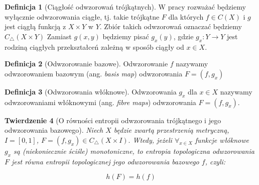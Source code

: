 \documentclass[licencjacka]{pwr_wmat_praca_dyplomowa}
\theoremstyle{plain}
\newtheorem{theorem}{Twierdzenie}
\numberwithin{theorem}{chapter}
\theoremstyle{definition}
\numberwithin{theorem}{chapter}
\newtheorem{definition}[theorem]{Definicja}
\begin{document}
\begin{definition}[Ciągłość odwzorowań trójkątnych]
W pracy rozważać będziemy wyłącznie odwzorowania ciągłe, tj. takie trójkątne $F$ dla których $f \in C(X)$ i $g$ jest ciągłą funkcją z $X \times Y$ w $Y$. 
Zbiór takich odwzorowań oznaczać będziemy $C_\triangle(X \times Y)$
Zamiast $g(x, y)$ będziemy pisać $g_x(y)$, gdzie $g_x: Y \rightarrow Y$ jest rodziną ciągłych przekształceń zależną w sposób ciągły od $x \in X$.
\end{definition}


\begin{definition}[Odwzorowanie bazowe]
Odwzorowanie $f$ nazywamy odwzorowaniem bazowym (ang. \textit{basis map}) odwzorowania $F = (f, g_x)$
\end{definition}

\begin{definition}[Odwzorowania włóknowe]
Odwzorowania $g_x$ dla $x \in X$ nazywamy odwzorowaniami włóknowymi (ang. \textit{fibre maps}) odwzorowania $F = (f, g_x)$.
\end{definition}


\begin{theorem}[O równości entropii odwzorowania trójkątnego i jego odwzorowania bazowego]
\label{rownosc_entropii_gdy_wlokna_monotoniczne}
Niech $X$ będzie zwartą przestrzenią metryczną, $I = [0, 1]$, $F = (f, g_x) \in C_\triangle(X \times I).$ Wtedy, jeżeli $\forall_{x \in X}$ funkcje włóknowe $g_x$ są (niekoniecznie ściśle) monotoniczne, to entropia topologiczna odwzorowania $F$ jest równa entropii topologicznej jego odwzorowania bazowego $f$, czyli:

$$h(F) = h(f)$$
\end{theorem}
\end{document}

